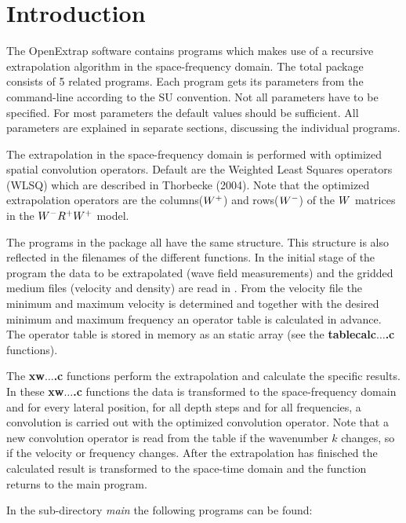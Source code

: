 \newpage
\section{\label{intro_extrap}Introduction} 

The OpenExtrap software contains programs which makes use of a recursive extrapolation algorithm in the space-frequency domain.  The total package consists of 5 related programs. 
Each program gets its parameters from the command-line according to the SU convention. 
Not all parameters have to be specified. 
For most parameters the default values should be sufficient. 
All parameters are explained in separate sections, discussing the individual programs.

The extrapolation in the space-frequency domain is performed with optimized spatial convolution operators. 
Default are the Weighted Least Squares operators (WLSQ) which are described in Thorbecke (2004).
Note that the optimized extrapolation operators are the columns($\boldmath W^+$) and rows($\boldmath W^-$) of the $\boldmath W$ matrices in the $\boldmath W^- \boldmath R^+ \boldmath W^+$ model. 

The programs in the package all have the same structure. 
This structure is also reflected in the filenames of the different functions. 
In the initial stage of the program the data to be extrapolated (wave field measurements) and the gridded medium files (velocity and density) are read in . 
From the velocity file the minimum and maximum velocity is determined and together with the desired minimum and maximum frequency an operator table is calculated in advance. 
The operator table is stored in memory as an static array (see the {\bf tablecalc$\dots$.c} functions). 

The {\bf xw$\dots$.c} functions perform the extrapolation and calculate the specific results. 
In these {\bf xw$\dots$.c} functions the data is transformed to the space-frequency domain and for every lateral position, for all depth steps and for all frequencies, a convolution is carried out with the optimized convolution operator. 
Note that a new convolution operator is read from the table if the wavenumber $k$ changes, so if the velocity or frequency changes.
After the extrapolation has finisched the calculated result is transformed to the space-time domain and the function returns to the main program.

In the sub-directory {\it main} the following programs can be found:

